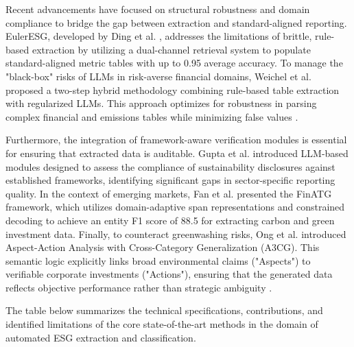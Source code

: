 Recent advancements have focused on structural robustness and domain compliance to bridge the gap between extraction and standard-aligned reporting. EulerESG, developed by Ding et al.  \parencite{yi_ding_136f177b}, addresses the limitations of brittle, rule-based extraction by utilizing a dual-channel retrieval system to populate standard-aligned metric tables with up to 0.95 average accuracy. To manage the "black-box" risks of LLMs in risk-averse financial domains, Weichel et al.  \parencite{hendrik_weichel_5ea70935} proposed a two-step hybrid methodology combining rule-based table extraction with regularized LLMs. This approach optimizes for robustness in parsing complex financial and emissions tables while minimizing false values  \parencite{hendrik_weichel_5ea70935}.

Furthermore, the integration of framework-aware verification modules is essential for ensuring that extracted data is auditable. Gupta et al.  \parencite{tanay_gupta_b5c91517} introduced LLM-based modules designed to assess the compliance of sustainability disclosures against established frameworks, identifying significant gaps in sector-specific reporting quality. In the context of emerging markets, Fan et al.  \parencite{j__h__fan_97bd591d} presented the FinATG framework, which utilizes domain-adaptive span representations and constrained decoding to achieve an entity F1 score of 88.5 for extracting carbon and green investment data. Finally, to counteract greenwashing risks, Ong et al.  \parencite[]{keane_ong_369a0b63, keane_ong_369a0b63} introduced Aspect-Action Analysis with Cross-Category Generalization (A3CG). This semantic logic explicitly links broad environmental claims ("Aspects") to verifiable corporate investments ("Actions"), ensuring that the generated data reflects objective performance rather than strategic ambiguity  \parencite[]{keane_ong_369a0b63, keane_ong_369a0b63}.

The table below summarizes the technical specifications, contributions, and identified limitations of the core state-of-the-art methods in the domain of automated ESG extraction and classification.

